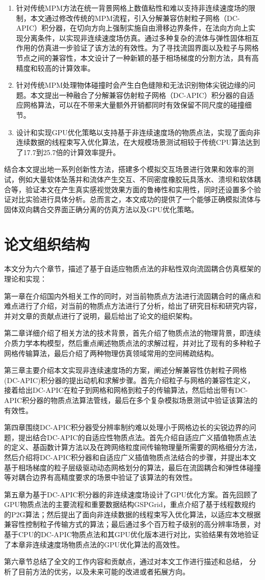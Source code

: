 \begin{enumerate} 
    \item[1.] 针对传统MPM方法在统一背景网格上数值粘性和难以支持非连续速度场的限制，本文通过修改传统的MPM流程，引入分解兼容仿射粒子网格（DC-APIC）积分器，在切向方向上强制实施自由滑移边界条件，在法向方向上实现分离条件，以实现非连续速度场仿真。通过多种复杂的流体与弹性固体相互作用的仿真进一步验证了该方法的有效性。为了寻找流固界面以及粒子与网格节点之间的兼容性，本文设计了一种新颖的基于相场梯度的分割方法，具有高精度和较高的计算效率。
    \item[2.] 针对传统MPM处理物体碰撞时会产生白色缝隙和无法识别物体尖锐边缘的问题。本文提出一种融合了分解兼容仿射粒子网格（DC-APIC）积分器的自适应网格算法，可以在不带来大量额外开销都同时有效保留不同尺度的碰撞细节。
    \item[3.] 设计和实现GPU优化策略以支持基于非连续速度场的物质点法，实现了面向非连续数据的线程束写入优化算法，在大规模场景测试相较于传统CPU算法达到了17.7到25.7倍的计算效率提升。
 \end{enumerate}
 结合本文提出地一系列创新性方法，搭建多个模拟交互场景进行效果和效率的测试，例如大量软体坠落并和流体产生交互、不同密度橡胶玩具落水、溃坝和软体耦合等，验证本文在产生真实感视觉效果方面的鲁棒性和实用性，同时还设置多个验证对比实验进行具体分析。总而言之，本文成功的提供了一个能够正确模拟流体与固体双向耦合交界面正确分离的仿真方法以及GPU优化策略。

\section{论文组织结构}
本文分为六个章节，描述了基于自适应物质点法的非粘性双向流固耦合仿真框架的理论和实现：

第一章在介绍国内外相关工作的同时，对当前物质点方法进行流固耦合时的痛点和难点进行了介绍，对当前的物质点方法进行了分析，给出了研究目标和研究内容，并对文章的贡献点进行了说明，最后给出了论文的组织架构。

第二章详细介绍了相关方法的技术背景，首先介绍了物质点法的物理背景，即连续介质力学本构模型，然后重点阐述物质点法的求解过程，并对比了现有的多种粒子网格传输算法，最后介绍了两种物理仿真领域常用的空间稀疏结构。

第三章主要介绍本文实现非连续速度场的方案，阐述分解兼容性仿射粒子网格(DC-APIC)积分器的提出动机和求解步骤。首先介绍粒子与网格的兼容性定义，接着给出DC-APIC在粒子到网格和网格到粒子的传输算法，然后给出带有DC-APIC积分器的物质点法算法管线，最后在多个复杂模拟场景测试中验证该算法的有效性。

第四章围绕DC-APIC积分器受分辨率制约难以处理小于网格边长的尖锐边界的问题，提出结合DC-APIC的自适应性物质点法。首先介绍自适应广义插值物质点法的定义、基函数计算方法以及在跨网络粒度间传输物理量所需要的网格细分方法，然后介绍将DC-APIC积分器和自适应广义插值物质点法结合的步骤，并提出本文基于相场梯度的粒子层级驱动动态网格划分的算法，最后在流固耦合和弹性体碰撞等对耦合边界有高精度要求的场景中验证了该算法的有效性。

第五章为基于DC-APIC积分器的非连续速度场设计了GPU优化方案。首先回顾了GPU物质点法的主要流程和重要数据结构GSPGrid，重点介绍了基于线程数规约的P2G算法；然后提出了面向非连续数据的线程束写入优化算法，以适应本文根据兼容性控制粒子传输方式的算法；最后通过多个百万粒子级别的高分辨率场景，对基于CPU的DC-APIC物质点法和其GPU优化版本进行对比，实验结果有效地验证了本章非连续速度场物质点法的GPU优化算法的高效性。

第六章节总结了全文的工作内容和贡献点，通过对本文工作进行描述和总结， 分析了目前方法的优劣，以及未来可能的改进或者拓展方向。